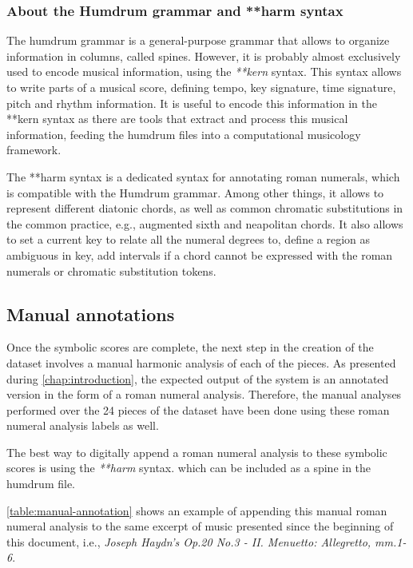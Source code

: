 \subsubsection{About the Humdrum grammar and **harm syntax}
The humdrum grammar is a general-purpose grammar that allows to organize information in columns, called spines. However, it is probably almost exclusively used to encode musical information, using the \emph{**kern} syntax. This syntax allows to write parts of a musical score, defining tempo, key signature, time signature, pitch and rhythm information. It is useful to encode this information in the **kern syntax as there are tools that extract and process this musical information, feeding the humdrum files into a computational musicology framework.

The **harm syntax is a dedicated syntax for annotating roman numerals, which is compatible with the Humdrum grammar. Among other things, it allows to represent different diatonic chords, as well as common chromatic substitutions in the common practice, e.g., augmented sixth and neapolitan chords. It also allows to set a current key to relate all the numeral degrees to, define a region as ambiguous in key, add intervals if a chord cannot be expressed with the roman numerals or chromatic substitution tokens.

\subsection{Manual annotations}
Once the symbolic scores are complete, the next step in the creation of the dataset involves a manual harmonic analysis of each of the pieces. As presented during \autoref{chap:introduction}, the expected output of the system is an annotated version in the form of a roman numeral analysis. Therefore, the manual analyses performed over the 24 pieces of the dataset have been done using these roman numeral analysis labels as well.

The best way to digitally append a roman numeral analysis to these symbolic scores is using the \emph{**harm} \cite{harm} syntax. which can be included as a spine in the humdrum file.

\autoref{table:manual-annotation} shows an example of appending this manual roman numeral analysis to the same excerpt of music presented since the beginning of this document, i.e., \emph{Joseph Haydn's Op.20 No.3 - II. Menuetto: Allegretto, mm.1-6}.

